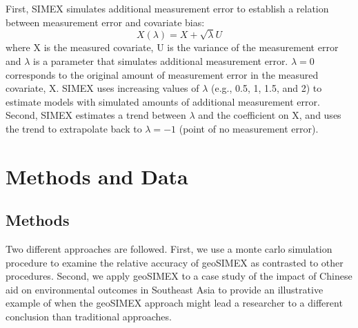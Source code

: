 First, SIMEX simulates additional measurement error to establish a relation between measurement error and covariate bias:
\begin{equation}
X(\lambda) = X + \sqrt{\lambda}U
\end{equation}
where X is the measured covariate, U is the variance of the measurement error and $\lambda$ is a parameter that simulates additional measurement error. 
$\lambda=0$ corresponds to the original amount of measurement error in the measured covariate, X. 
SIMEX uses increasing values of $\lambda$ (e.g., 0.5, 1, 1.5, and 2) to estimate models with simulated amounts of additional measurement error. 
Second, SIMEX estimates a trend between $\lambda$ and the coefficient on X, and uses the trend to extrapolate back to $\lambda = -1$ (point of no measurement error).







\newpage

\section{Methods and Data}
\subsection{Methods}
Two different approaches are followed. 
First, we use a monte carlo simulation procedure to examine the relative accuracy of geoSIMEX as contrasted to other procedures.  
Second, we apply geoSIMEX to a case study of the impact of Chinese aid on environmental outcomes in Southeast Asia to provide an illustrative example of when the geoSIMEX approach might lead a researcher to a different conclusion than traditional approaches.

